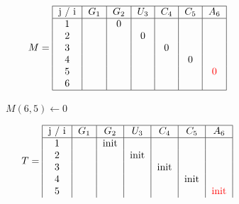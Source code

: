 \begin{figure}[H]
    \centering
    \begin{subfigure}[t]{0.25\textwidth}
        \scriptsize \[
                        M =  \begin{tabular}{|c|c|c|c|c|c|c|}
                                 \hline
                                 j / i & $G_1$ & $G_2$ & $U_3$ & $C_4$ & $C_5$ & $A_6$              \\ \hline
                                 1     &       & 0     &       &       &       &                    \\
                                 2     &       &       & 0     &       &       &                    \\
                                 3     &       &       &       & 0     &       &                    \\
                                 4     &       &       &       &       & 0     &                    \\
                                 5     &       &       &       &       &       & \textcolor{red}{0} \\
                                 6     &       &       &       &       &       &                    \\ \hline
                        \end{tabular}
        \]
        \caption{$M(6,5) \gets 0$}
    \end{subfigure}
    \hfill
    \begin{subfigure}[t]{0.65\textwidth}
        \scriptsize \[
                        T =     \begin{tabular}{|c|c|c|c|c|c|c|}
                                    \hline
                                    j / i & $G_1$ & $G_2$ & $U_3$ & $C_4$ & $C_5$ & $A_6$                 \\ \hline
                                    1     &       & init  &       &       &       &                       \\
                                    2     &       &       & init  &       &       &                       \\
                                    3     &       &       &       & init  &       &                       \\
                                    4     &       &       &       &       & init  &                       \\
                                    5     &       &       &       &       &       & \textcolor{red}{init} \\

\end{tabular}\]
\end{subfigure}
\end{figure}
